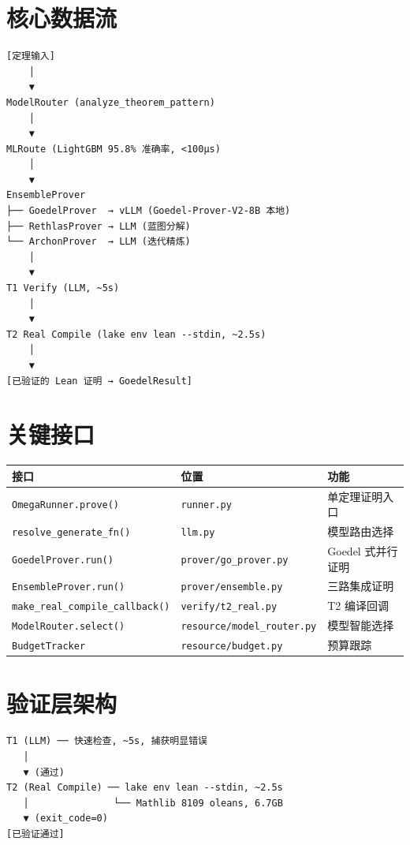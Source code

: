 \documentclass[
  11pt,
  a4paper,
]{ctexrep}
\newcounter{none} %
\begin{document}
\section{核心数据流}\label{sec-dataflow}

\begin{verbatim}
[定理输入]
    │
    ▼
ModelRouter (analyze_theorem_pattern)
    │
    ▼
MLRoute (LightGBM 95.8% 准确率, <100µs)
    │
    ▼
EnsembleProver
├── GoedelProver  → vLLM (Goedel-Prover-V2-8B 本地)
├── RethlasProver → LLM (蓝图分解)
└── ArchonProver  → LLM (迭代精炼)
    │
    ▼
T1 Verify (LLM, ~5s)
    │
    ▼
T2 Real Compile (lake env lean --stdin, ~2.5s)
    │
    ▼
[已验证的 Lean 证明 → GoedelResult]
\end{verbatim}

\section{关键接口}\label{sec-interfaces}

{\def\LTcaptype{none} %
\begin{longtable}[]{@{}lll@{}}
\toprule\noalign{}
接口 & 位置 & 功能 \\
\midrule\noalign{}
\endhead
\bottomrule\noalign{}
\endlastfoot
\texttt{OmegaRunner.prove()} & \texttt{runner.py} & 单定理证明入口 \\
\texttt{resolve\_generate\_fn()} & \texttt{llm.py} & 模型路由选择 \\
\texttt{GoedelProver.run()} & \texttt{prover/go\_prover.py} & Goedel
式并行证明 \\
\texttt{EnsembleProver.run()} & \texttt{prover/ensemble.py} &
三路集成证明 \\
\texttt{make\_real\_compile\_callback()} & \texttt{verify/t2\_real.py} &
T2 编译回调 \\
\texttt{ModelRouter.select()} & \texttt{resource/model\_router.py} &
模型智能选择 \\
\texttt{BudgetTracker} & \texttt{resource/budget.py} & 预算跟踪 \\
\end{longtable}
}

\section{验证层架构}\label{sec-verification}

\begin{verbatim}
T1 (LLM) ── 快速检查, ~5s, 捕获明显错误
   │
   ▼ (通过)
T2 (Real Compile) ── lake env lean --stdin, ~2.5s
   │               └── Mathlib 8109 oleans, 6.7GB
   ▼ (exit_code=0)
[已验证通过]
\end{verbatim}
\end{document}
